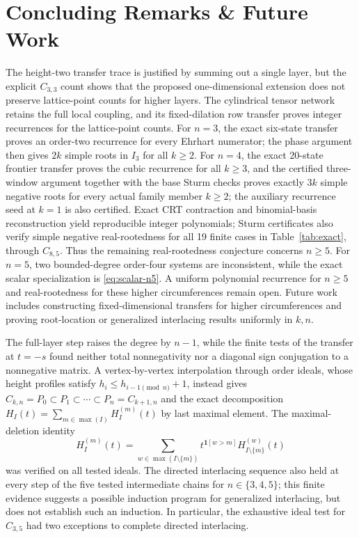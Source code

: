 \documentclass[11pt,a4paper]{article}
\theoremstyle{definition}
\begin{document}
\section{Concluding Remarks \& Future Work}

The height-two transfer trace is justified by summing out a single layer, but the explicit $C_{3,3}$ count shows that the proposed one-dimensional extension does not preserve lattice-point counts for higher layers. The cylindrical tensor network retains the full local coupling, and its fixed-dilation row transfer proves integer recurrences for the lattice-point counts. For $n=3$, the exact six-state transfer proves an order-two recurrence for every Ehrhart numerator; the phase argument then gives $2k$ simple roots in $I_3$ for all $k\ge2$. For $n=4$, the exact 20-state frontier transfer proves the cubic recurrence for all $k\ge3$, and the certified three-window argument together with the base Sturm checks proves exactly $3k$ simple negative roots for every actual family member $k\ge2$; the auxiliary recurrence seed at $k=1$ is also certified. Exact CRT contraction and binomial-basis reconstruction yield reproducible integer polynomials; Sturm certificates also verify simple negative real-rootedness for all 19 finite cases in Table~\ref{tab:exact}, through $C_{8,5}$. Thus the remaining real-rootedness conjecture concerns $n\ge5$. For $n=5$, two bounded-degree order-four systems are inconsistent, while the exact scalar specialization is \eqref{eq:scalar-n5}. A uniform polynomial recurrence for $n\ge5$ and real-rootedness for these higher circumferences remain open. Future work includes constructing fixed-dimensional transfers for higher circumferences and proving root-location or generalized interlacing results uniformly in $k,n$.

The full-layer step raises the degree by $n-1$, while the finite tests of the transfer at $t=-s$ found neither total nonnegativity nor a diagonal sign conjugation to a nonnegative matrix. A vertex-by-vertex interpolation through order ideals, whose height profiles satisfy $h_i\le h_{i-1\pmod n}+1$, instead gives
$C_{k,n}=P_0\subset P_1\subset\cdots\subset P_n=C_{k+1,n}$ and the exact decomposition
$H_I(t)=\sum_{m\in\max(I)}H_I^{(m)}(t)$ by last maximal element. The maximal-deletion identity
\[
H_I^{(m)}(t)=\sum_{w\in\max(I\setminus\{m\})}
t^{\mathbf{1}[w>m]}H_{I\setminus\{m\}}^{(w)}(t)
\]
was verified on all tested ideals. The directed interlacing sequence also held at every step of the five tested intermediate chains for $n\in\{3,4,5\}$; this finite evidence suggests a possible induction program for generalized interlacing, but does not establish such an induction. In particular, the exhaustive ideal test for $C_{3,5}$ had two exceptions to complete directed interlacing.
\end{document}
